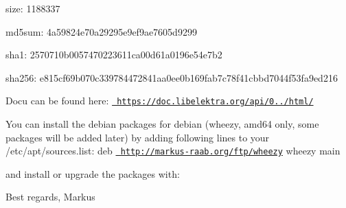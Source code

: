 \begin{DoxyItemize}
\item size\+: 1188337
\item md5sum\+: 4a59824e70a29295e9ef9ae7605d9299
\item sha1\+: 2570710b0057470223611ca00d61a0196e54e7b2
\item sha256\+: e815cf69b070c339784472841aa0ee0b169fab7c78f41cbbd7044f53fa9ed216
\end{DoxyItemize}

Docu can be found here\+: \href{https://doc.libelektra.org/api/0.8.6/html/}{\texttt{ https\+://doc.\+libelektra.\+org/api/0../html/}}

You can install the debian packages for debian (wheezy, amd64 only, some packages will be added later) by adding following lines to your /etc/apt/sources.list\+: deb \href{http://markus-raab.org/ftp/wheezy}{\texttt{ http\+://markus-\/raab.\+org/ftp/wheezy}} wheezy main

and install or upgrade the packages with\+:


\begin{DoxyCode}{0}
\end{DoxyCode}


Best regards, Markus 